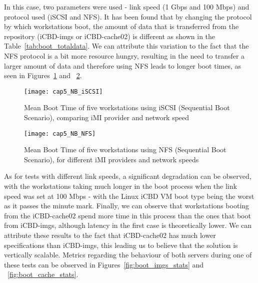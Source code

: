 In this case, two parameters were used - link speed (1 Gbps and 100 Mbps) and protocol used (iSCSI and NFS). It has been found that by changing the protocol by which workstations boot, the amount of data that is transferred from the repository (iCBD-imgs or iCBD-cache02) is different as shown in the Table~\ref{tab:boot_totaldata}. We can attribute this variation to the fact that the NFS protocol is a bit more resource hungry, resulting in the need to transfer a larger amount of data and therefore using NFS leads to longer boot times, as seen in Figures~\ref{fig:boot_iscsi} and ~\ref{fig:boot_nfs}.

\begin{figure}[htbp]
	\centering
	\texttt{[image: cap5\_NB\_iSCSI]}
	\caption{Mean Boot Time of five workstations using iSCSI (Sequential Boot Scenario), comparing iMI provider and network speed}
	\label{fig:boot_iscsi}
\end{figure}

\begin{figure}[htbp]
	\centering
	\texttt{[image: cap5\_NB\_NFS]}
	\caption{Mean Boot Time of five workstations using NFS (Sequential Boot Scenario), for different iMI providers and network speeds}
	\label{fig:boot_nfs}
\end{figure}



As for tests with different link speeds, a significant degradation can be observed, with the workstations taking much longer in the boot process when the link speed was set at 100 Mbps - with the Linux iCBD VM boot type being the worst as it passes the minute mark. Finally, we can observe that workstations booting from the iCBD-cache02 spend more time in this process than the ones that boot from iCBD-imgs, although latency in the first case is theoretically lower. We can attribute these results to the fact that iCBD-cache02 has much lower specifications than iCBD-imgs, this leading us to believe that the solution is vertically scalable. Metrics regarding the behaviour of both servers during one of these tests can be observed in Figures~\ref{fig:boot_imgs_stats} and ~\ref{fig:boot_cache_stats}.


